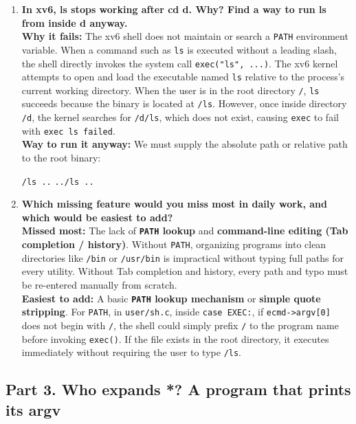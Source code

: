 \documentclass{labreport}
\begin{document}
\begin{enumerate}[leftmargin=*]
    \item \textbf{In xv6, ls stops working after cd d. Why? Find a way to run ls from inside d anyway.}\\[0.2em]
    \textbf{Why it fails:} The xv6 shell does not maintain or search a \texttt{PATH} environment variable. When a command such as \texttt{ls} is executed without a leading slash, the shell directly invokes the system call \texttt{exec("ls", ...)}. The xv6 kernel attempts to open and load the executable named \texttt{ls} relative to the process's current working directory. When the user is in the root directory \texttt{/}, \texttt{ls} succeeds because the binary is located at \texttt{/ls}. However, once inside directory \texttt{/d}, the kernel searches for \texttt{/d/ls}, which does not exist, causing \texttt{exec} to fail with \texttt{exec ls failed}.\\
    \textbf{Way to run it anyway:} We must supply the absolute path or relative path to the root binary:
    \begin{center}
    \texttt{/ls ..} \quad {} \quad \texttt{../ls ..}
    \end{center}

    \item \textbf{Which missing feature would you miss most in daily work, and which would be easiest to add?}\\[0.2em]
    \textbf{Missed most:} The lack of \textbf{\texttt{PATH} lookup} and \textbf{command-line editing (Tab completion / history)}. Without \texttt{PATH}, organizing programs into clean directories like \texttt{/bin} or \texttt{/usr/bin} is impractical without typing full paths for every utility. Without Tab completion and history, every path and typo must be re-entered manually from scratch.\\
    \textbf{Easiest to add:} A basic \textbf{\texttt{PATH} lookup mechanism} or \textbf{simple quote stripping}. For \texttt{PATH}, in \texttt{user/sh.c}, inside \texttt{case EXEC:}, if \texttt{ecmd->argv[0]} does not begin with \texttt{/}, the shell could simply prefix \texttt{/} to the program name before invoking \texttt{exec()}. If the file exists in the root directory, it executes immediately without requiring the user to type \texttt{/ls}.
\end{enumerate}

\subsection{Part 3. Who expands *? A program that prints its argv}
\end{document}
